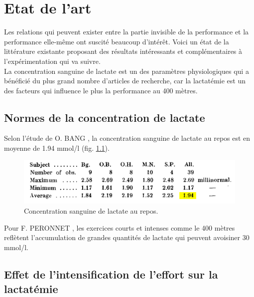 \chapter{Etat de l'art}
\label{part:etat_art}

Les relations qui peuvent exister entre la partie invisible de la performance et la performance elle-même ont suscité beaucoup d'intérêt. Voici un état de la littérature existante proposant des résultats intéressants et complémentaires à l'expérimentation qui va suivre.\\

La concentration sanguine de lactate est un des paramètres physiologiques qui a bénéficié du plus grand nombre d'articles de recherche, car la lactatémie est un des facteurs qui influence le plus la performance au 400 mètres.\\

   \section{Normes de la concentration de lactate}
       
       Selon l'étude de O. BANG \cite{bang36}, la concentration sanguine de lactate au repos est en moyenne de 1.94 mmol/l (fig. \ref{fig:lactate_repos}).\\
       
       \begin{figure}[H]
                \centering
                \includegraphics[scale=1]{images/lactate_repos.PNG}
                \caption{\label{fig:lactate_repos}Concentration sanguine de lactate au repos.}
        \end{figure}
        
       Pour F. PERONNET \cite{peronnet13}, les exercices courts et intenses comme le 400 mètres reflètent l'accumulation de grandes quantités de lactate qui peuvent avoisiner 30 mmol/l.
        
    \section{Effet de l'intensification de l'effort sur la lactatémie}
    
